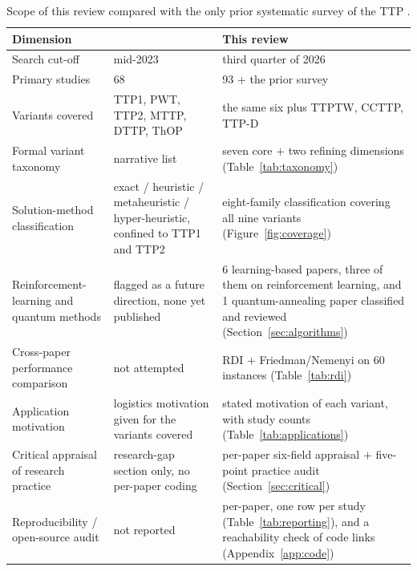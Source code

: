 \begin{table}[htbp]
\centering
\footnotesize
\caption{Scope of this review compared with the only prior systematic survey of the TTP \citep{sarkar2024travelling}.}
\label{tab:reviewscope}
\setlength{\tabcolsep}{4pt}
\begin{tabular}{@{}p{5.0cm}p{5.5cm}p{5.3cm}@{}}
\toprule
\textbf{Dimension} & \textbf{\citet{sarkar2024travelling}} & \textbf{This review} \\
\midrule
Search cut-off & mid-2023  & third quarter of 2026 \\
Primary studies & 68 & 93 + the prior survey \\
Variants covered & TTP1, PWT, TTP2, MTTP, DTTP, ThOP & the same six plus TTPTW, CCTTP, TTP-D \\
Formal variant taxonomy & narrative list & seven core $+$ two refining dimensions (Table~\ref{tab:taxonomy}) \\
Solution-method classification & exact / heuristic / metaheuristic / hyper-heuristic, confined to TTP1 and TTP2 & eight-family classification covering all nine variants (Figure~\ref{fig:coverage}) \\
Reinforcement-learning and quantum methods & flagged as a future direction, none yet published & 6 learning-based papers, three of them on reinforcement learning, and 1 quantum-annealing paper classified and reviewed (Section~\ref{sec:algorithms}) \\
Cross-paper performance comparison & not attempted & RDI $+$ Friedman/Nemenyi on 60 instances (Table~\ref{tab:rdi}) \\
Application motivation & logistics motivation given for the variants covered & stated motivation of each variant, with study counts (Table~\ref{tab:applications}) \\
Critical appraisal of research practice & research-gap section only, no per-paper coding & per-paper six-field appraisal $+$ five-point practice audit (Section~\ref{sec:critical}) \\
Reproducibility / open-source audit & not reported & per-paper, one row per study (Table~\ref{tab:reporting}), and a reachability check of code links (Appendix~\ref{app:code}) \\
\bottomrule
\end{tabular}
\end{table}
